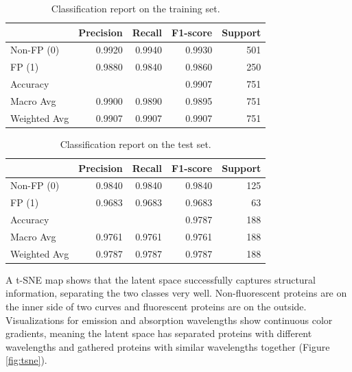 \documentclass[unnumsec,webpdf,contemporary,medium]{oup-authoring-template}
\begin{document}
\begin{table}[!ht]
\centering
\caption{Classification report on the training set.}\label{tab:class_report_train}
\begin{tabular*}{0.5\textwidth}{@{\extracolsep{\fill}}lrrrr}
\toprule
& \textbf{Precision} & \textbf{Recall} & \textbf{F1-score} & \textbf{Support} \\
\midrule
Non-FP (0) & 0.9920 & 0.9940 & 0.9930 & 501 \\
FP (1) & 0.9880 & 0.9840 & 0.9860 & 250 \\
\midrule
Accuracy & & & 0.9907 & 751 \\
Macro Avg & 0.9900 & 0.9890 & 0.9895 & 751 \\
Weighted Avg & 0.9907 & 0.9907 & 0.9907 & 751 \\
\bottomrule
\end{tabular*}
\end{table}

\begin{table}[!ht]
\centering
\caption{Classification report on the test set.}\label{tab:class_report_test}
\begin{tabular*}{0.5\textwidth}{@{\extracolsep{\fill}}lrrrr}
\toprule
& \textbf{Precision} & \textbf{Recall} & \textbf{F1-score} & \textbf{Support} \\
\midrule
Non-FP (0) & 0.9840 & 0.9840 & 0.9840 & 125 \\
FP (1) & 0.9683 & 0.9683 & 0.9683 & 63 \\
\midrule
Accuracy & & & 0.9787 & 188 \\
Macro Avg & 0.9761 & 0.9761 & 0.9761 & 188 \\
Weighted Avg & 0.9787 & 0.9787 & 0.9787 & 188 \\
\bottomrule
\end{tabular*}
\end{table}

A t-SNE map \cite{maaten2008visualizing} shows that the latent space successfully captures structural information, separating the two classes very well. Non-fluorescent proteins are on the inner side of two curves and fluorescent proteins are on the outside. Visualizations for emission and absorption wavelengths show continuous color gradients, meaning the latent space has separated proteins with different wavelengths and gathered proteins with similar wavelengths together (Figure \ref{fig:tsne}).
\end{document}
